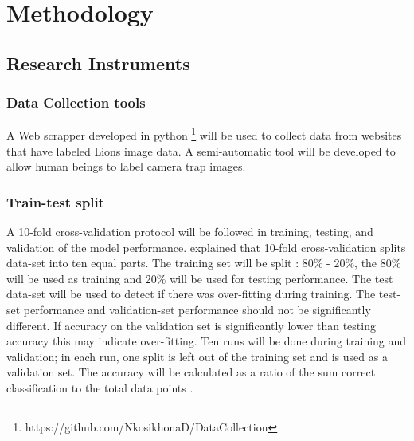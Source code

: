\section{Methodology}\label{methodology}
\subsection{Research Instruments} %
\subsubsection{Data Collection tools}
A Web scrapper developed in python \footnote{https://github.com/NkosikhonaD/DataCollection} will be used to collect data from websites that have labeled Lions image data.  
 A semi-automatic tool will be developed to allow human beings to label camera trap images. 
\subsubsection{Train-test split}
A 10-fold cross-validation protocol will be followed in training, testing, and validation of the model performance. \citeauthor{kohavi1995study} \citeyear{kohavi1995study} \cite{kohavi1995study} explained that 10-fold cross-validation splits data-set into ten equal parts. The training set will be split : 80\% - 20\%, the 80\% will be used as training and 20\% will be used for testing performance. The test data-set will be used to detect if there was over-fitting during training. The test-set performance and validation-set  performance should not be significantly different. If accuracy on the validation set is significantly lower than testing accuracy this may indicate over-fitting. Ten runs will be done during training and validation; in each run, one split is left out of the training set and is used as a validation set. The accuracy will be calculated as a ratio of the sum correct classification to the total data points \cite{witten2016data}.

